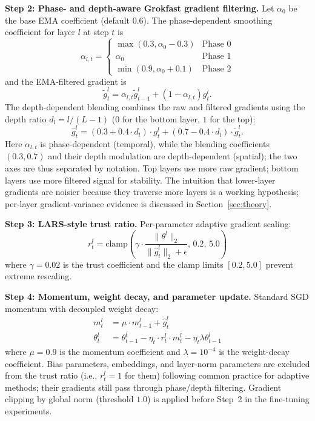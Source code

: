 \documentclass[a4paper,fleqn]{cas-dc}
\begin{document}
\textbf{Step 2: Phase- and depth-aware Grokfast gradient filtering.} Let $\alpha_0$ be the base EMA coefficient (default $0.6$). The phase-dependent smoothing coefficient for layer $l$ at step $t$ is
\begin{equation}\label{eq:dals_alpha}
\alpha_{l,t} = \begin{cases} \max(0.3, \alpha_0 - 0.3) & \text{Phase 0} \\ \alpha_0 & \text{Phase 1} \\ \min(0.9, \alpha_0 + 0.1) & \text{Phase 2} \end{cases}
\end{equation}
and the EMA-filtered gradient is
\begin{equation}\label{eq:dals_ema}
\tilde{g}_t^l = \alpha_{l,t} \tilde{g}_{t-1}^l + (1 - \alpha_{l,t}) g_t^l.
\end{equation}
The depth-dependent blending combines the raw and filtered gradients using the depth ratio $d_l = l / (L-1)$ ($0$ for the bottom layer, $1$ for the top):
\begin{equation}\label{eq:dals_blend}
\hat{g}_t^l = (0.3 + 0.4 \cdot d_l) \cdot g_t^l + (0.7 - 0.4 \cdot d_l) \cdot \tilde{g}_t^l.
\end{equation}
Here $\alpha_{l,t}$ is phase-dependent (temporal), while the blending coefficients $(0.3, 0.7)$ and their depth modulation are depth-dependent (spatial); the two axes are thus separated by notation. Top layers use more raw gradient; bottom layers use more filtered signal for stability. The intuition that lower-layer gradients are noisier because they traverse more layers is a working hypothesis; per-layer gradient-variance evidence is discussed in Section~\ref{sec:theory}.

\textbf{Step 3: LARS-style trust ratio.} Per-parameter adaptive gradient scaling:
\begin{equation}\label{eq:dals_trust}
r_t^l = \mathrm{clamp}\left(\gamma \cdot \frac{\|\theta^l\|_2}{\|\hat{g}_t^l\|_2 + \epsilon}, \, 0.2, \, 5.0\right)
\end{equation}
where $\gamma = 0.02$ is the trust coefficient and the clamp limits $[0.2, 5.0]$ prevent extreme rescaling.

\textbf{Step 4: Momentum, weight decay, and parameter update.} Standard SGD momentum with decoupled weight decay:
\begin{align}
m_t^l &= \mu \cdot m_{t-1}^l + \hat{g}_t^l \label{eq:dals_momentum}\\
\theta_t^l &= \theta_{t-1}^l - \eta_t \cdot r_t^l \cdot m_t^l - \eta_t \lambda \theta_{t-1}^l \label{eq:dals_update}
\end{align}
where $\mu=0.9$ is the momentum coefficient and $\lambda=10^{-4}$ is the weight-decay coefficient. Bias parameters, embeddings, and layer-norm parameters are excluded from the trust ratio (i.e., $r_t^l=1$ for them) following common practice for adaptive methods; their gradients still pass through phase/depth filtering. Gradient clipping by global norm (threshold $1.0$) is applied before Step~2 in the fine-tuning experiments.
\end{document}

